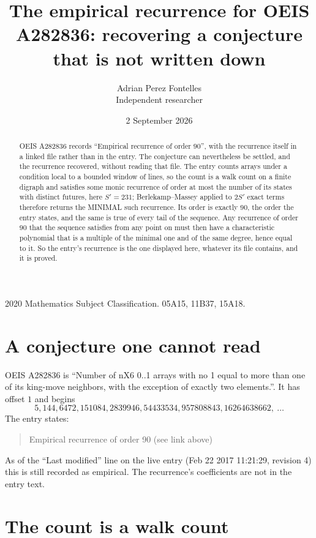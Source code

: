 \documentclass[11pt,a4paper]{article}
\title{The empirical recurrence for OEIS A282836: recovering a conjecture that is not written down}
\author{Adrian Perez Fontelles\\ \small Independent researcher}
\date{2 September 2026}
\theoremstyle{plain}
\theoremstyle{definition}
\begin{document}
\maketitle

\begin{abstract}
OEIS A282836 records ``Empirical recurrence of order $90$'', with the recurrence itself in a
linked file rather than in the entry. The conjecture can nevertheless be settled, and the
recurrence recovered, without reading that file. The entry counts arrays under a condition
local to a bounded window of lines, so the count is a walk count on a finite digraph and
satisfies some monic recurrence of order at most the number of its states with distinct
futures, here $S'=231$; Berlekamp--Massey applied to $2S'$ exact
terms therefore returns the MINIMAL such recurrence. Its order is exactly $90$, the order
the entry states, and the same is true of every tail of the sequence. Any recurrence of order
$90$ that the sequence satisfies from any point on must then have a characteristic
polynomial that is a multiple of the minimal one and of the same degree, hence equal to it. So
the entry's recurrence is the one displayed here, whatever its file contains, and it is
proved.
\end{abstract}

\noindent\small 2020 Mathematics Subject Classification. 05A15, 11B37, 15A18.\normalsize

\section{A conjecture one cannot read}

OEIS A282836 is ``Number of nX6 0..1 arrays with no 1 equal to more than one of its king-move neighbors, with the exception of exactly two elements.''. It has offset $1$ and begins
\[
5, 144, 6472, 151084, 2839946, 54433534, 957808843, 16264638662,\ \dots
\]
The entry states:
\begin{quote}
Empirical recurrence of order 90 (see link above)
\end{quote}
As of the ``Last modified'' line on the live entry (Feb 22 2017 11:21:29, revision 4) this is still
recorded as empirical. The recurrence's coefficients are not in the entry text.

\section{The count is a walk count}
\end{document}
